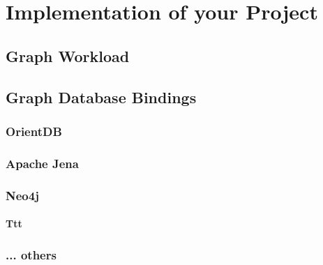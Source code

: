 \chapter{Implementation of your Project}
\label{ch:Implementation}

\section{Graph Workload}

\section{Graph Database Bindings}

\subsection{OrientDB}

\subsection{Apache Jena}

\subsection{Neo4j}

\subsubsection{Ttt}

\subsection{... others}
